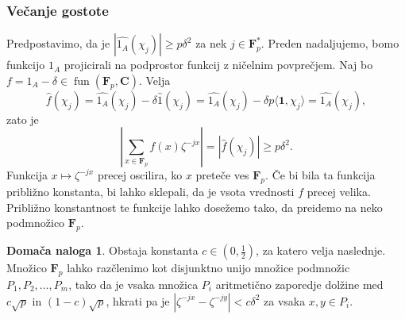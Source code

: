 \documentclass[11pt]{book}
\def\CC{\mathbf{C}}
\def\oneone{\mathbf{1}}
\def\FF{\mathbf{F}}
\DeclareMathOperator\fun{fun}
\theoremstyle{definition}
\theoremstyle{zgled}
\theoremstyle{zgledbrezstevilke}
\theoremstyle{odprtproblem}
\theoremstyle{domacanaloga}
\newtheorem{domacanaloga}[theorem]{Domača naloga}
\theoremstyle{izrek}
\begin{document}
\subsubsection{Večanje gostote}

Predpostavimo, da je $|\widehat{1_A}(\chi_j)| \geq p \delta^2$ za nek $j \in \FF_p^*$. Preden nadaljujemo, bomo funkcijo $1_A$ projicirali na podprostor funkcij z ničelnim povprečjem. Naj bo $f = 1_A - \delta \in \fun(\FF_p, \CC)$. Velja
\[
    \widehat{f}(\chi_j) = \widehat{1_A}(\chi_j) - \delta \widehat{1}(\chi_j)
    = \widehat{1_A}(\chi_j) - \delta p \langle \oneone, \chi_j \rangle
    = \widehat{1_A}(\chi_j),
\]
zato je
\[
    \left|\sum_{x \in \FF_p} f(x) \zeta^{-jx}\right| = |\widehat{f}(\chi_j)| \geq p \delta^2.
\]
Funkcija $x \mapsto \zeta^{-jx}$ precej oscilira, ko $x$ preteče ves $\FF_p$. Če bi bila ta funkcija približno konstanta, bi lahko sklepali, da je vsota vrednosti $f$ precej velika. Približno konstantnost te funkcije lahko dosežemo tako, da preidemo na neko podmnožico $\FF_p$.

\begin{domacanaloga}
Obstaja konstanta $c \in (0,\frac12)$, za katero velja naslednje. Množico $\FF_p$ lahko razčlenimo kot disjunktno unijo množice podmnožic $P_1, P_2, \dots, P_m$, tako da je vsaka množica $P_i$ aritmetično zaporedje dolžine med $c \sqrt{p}$ in $(1-c) \sqrt{p}$, hkrati pa je $|\zeta^{-jx} - \zeta^{-jy}| < c \delta^2$ za vsaka $x,y \in P_i$.
\end{domacanaloga}
\end{document}
